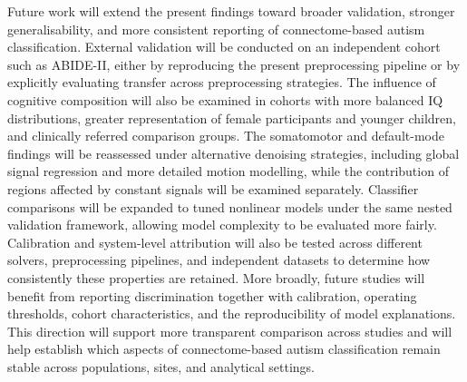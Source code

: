 Future work will extend the present findings toward broader validation, stronger generalisability, and more consistent reporting of connectome-based autism classification. External validation will be conducted on an independent cohort such as ABIDE-II, either by reproducing the present preprocessing pipeline or by explicitly evaluating transfer across preprocessing strategies. The influence of cognitive composition will also be examined in cohorts with more balanced IQ distributions, greater representation of female participants and younger children, and clinically referred comparison groups. The somatomotor and default-mode findings will be reassessed under alternative denoising strategies, including global signal regression and more detailed motion modelling, while the contribution of regions affected by constant signals will be examined separately. Classifier comparisons will be expanded to tuned nonlinear models under the same nested validation framework, allowing model complexity to be evaluated more fairly. Calibration and system-level attribution will also be tested across different solvers, preprocessing pipelines, and independent datasets to determine how consistently these properties are retained. More broadly, future studies will benefit from reporting discrimination together with calibration, operating thresholds, cohort characteristics, and the reproducibility of model explanations. This direction will support more transparent comparison across studies and will help establish which aspects of connectome-based autism classification remain stable across populations, sites, and analytical settings.